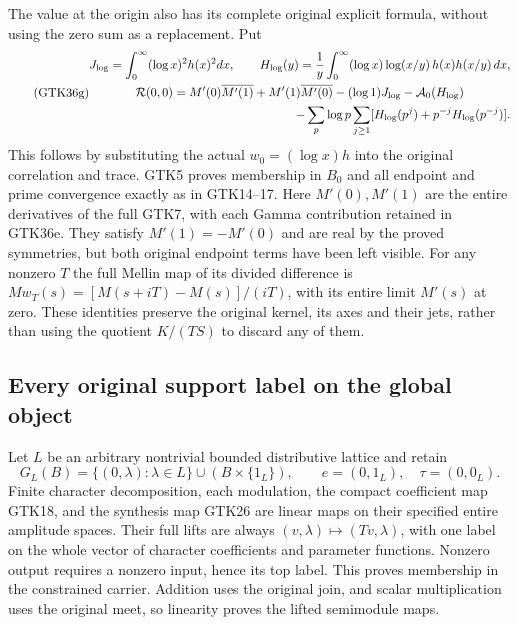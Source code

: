 The value at the origin also has its
complete original explicit formula,
without using the zero sum as a
replacement. Put
\begin{equation}\tag{GTK36g}
 \begin{gathered}
 J_{\log}=\int_0^\infty(\log x)^2h(x)^2dx,\qquad
 H_{\log}(y)=\frac1y\int_0^\infty
        (\log x)\log(x/y)\,h(x)h(x/y)\,dx,\\
 \mathcal R(0,0)=
 M'(0)\overline{M'(1)}+M'(1)\overline{M'(0)}
       -(\log1)J_{\log}-\mathcal A_0(H_{\log})\\
 \hfill
 -\sum_p\log p\sum_{j\ge1}
        [H_{\log}(p^j)+p^{-j}H_{\log}(p^{-j})].
 \end{gathered}
\end{equation}
This follows by substituting the actual
$w_0=(\log x)h$ into the original
correlation and trace. GTK5 proves
membership in $B_0$ and all endpoint
and prime convergence exactly as in
GTK14--17. Here $M'(0),M'(1)$ are
the entire derivatives of the full
GTK7, with each Gamma contribution
retained in GTK36e. They satisfy
$M'(1)=-M'(0)$ and are real by the
proved symmetries, but both original
endpoint terms have been left visible.
For any nonzero $T$ the full Mellin
map of its divided difference is
$Mw_T(s)=[M(s+iT)-M(s)]/(iT)$,
with its entire limit $M'(s)$ at
zero. These identities preserve the
original kernel, its axes and their
jets, rather than using the quotient
$K/(TS)$ to discard any of them.

\subsection{Every original support label on the global object}

Let $L$ be an arbitrary nontrivial bounded
distributive lattice and retain
\begin{equation}\tag{GTK37}
 G_L(B)=\{(0,\lambda):\lambda\in L\}
                   \cup(B\times\{1_L\}),\qquad
 e=(0,1_L),\quad\tau=(0,0_L).
\end{equation}
Finite character decomposition, each modulation,
the compact coefficient map GTK18, and the
synthesis map GTK26 are linear maps on their
specified entire amplitude spaces. Their full
lifts are always $(v,\lambda)\mapsto(Tv,\lambda)$,
with one label on the whole vector of character
coefficients and parameter functions. Nonzero
output requires a nonzero input, hence its top
label. This proves membership in the constrained
carrier. Addition uses the original join, and
scalar multiplication uses the original meet,
so linearity proves the lifted semimodule maps.

